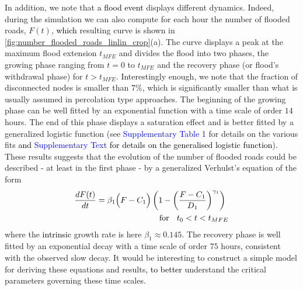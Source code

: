 \documentclass[twocolumn,fleqn,10pt]{wlscirep}
\begin{document}
In addition, we note that \textcolor{black}{a flood event} displays different dynamics. Indeed, during the simulation we can also compute for each hour the number of flooded roads, $F(t)$, \textcolor{black}{which} resulting curve is shown in \cref{fig:number_flooded_roads_linlin_crop}(a). The curve displays a peak at the maximum flood extension $t_{MFE}$ and divides the flood into two phases, the growing phase ranging from $t=0$ to $t_{MFE}$ and the recovery phase (or flood's withdrawal phase) for $t>t_{MFE}$. Interestingly enough, we note that the fraction of disconnected nodes is smaller than $7\%$\textcolor{black}{,} which is significantly smaller than what is usually assumed in percolation type approaches.
The beginning of the growing phase can be well fitted by an exponential function with a time scale of order $14$ hours. The end of this phase displays a saturation effect and is better fitted by a generalized logistic function (see
\textcolor{blue}{Supplementary Table 1}
for details on the various fits \textcolor{black}{and 
\textcolor{blue}{Supplementary Text}
for details on the generalised logistic function}). These results suggests that the evolution of the number of flooded roads could be described - at least in the first 
phase - by a generalized Verhulst's equation  \cite{Verhulst} of the form
\begin{equation}
\begin{split}
    \frac{dF(t)}{dt} = \beta_1 \Bigl(F-C_1\Bigr) &\left(1 - \left( \frac{F-C_1}{D_1} \right)^{\gamma_1} \right) \\ 
    &\quad \text{for \; $t_0<t<t_{MFE}$} 
\end{split}
%
\label{eq:generalized_Verhulst_equation}
\end{equation}
where the \textcolor{black}{intrinsic} growth rate is here $\beta_1\approx 0.145$. %
%
%
The recovery phase is well fitted by an exponential decay with a time scale of order $75$ hours\textcolor{black}{,} consistent with the observed slow decay. It would be interesting to construct a simple model for deriving these equations and results\textcolor{black}{, to better} understand the critical parameters governing these time scales. 
\end{document}
